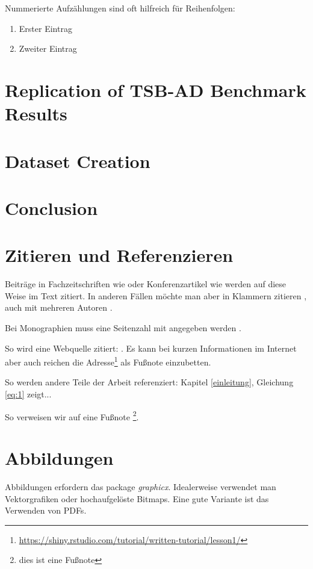 \documentclass[12pt,oneside]{article}
\begin{document}
Nummerierte Aufzählungen sind oft hilfreich für Reihenfolgen:
\begin{enumerate}
    \item Erster Eintrag
    \item Zweiter Eintrag
\end{enumerate}

\section{Replication of TSB-AD Benchmark Results}

\section{Dataset Creation}

\section{Conclusion}

\section{Zitieren und Referenzieren}

Beiträge in Fachzeitschriften wie \citet{clemen1989combining} oder Konferenzartikel wie \citet{he2017mask} werden auf diese Weise im Text zitiert. In anderen Fällen möchte man aber in Klammern zitieren \citep{clemen1989combining}, auch mit mehreren Autoren \citep{clemen1989combining,baumol1958warehouse,he2017mask}.

Bei Monographien muss eine Seitenzahl mit angegeben werden \citep[S. 28]{chollet2018deep}.

So wird eine Webquelle zitiert: \citet{shiny1}. Es kann bei kurzen Informationen im Internet aber auch reichen die Adresse\footnote{\url{https://shiny.rstudio.com/tutorial/written-tutorial/lesson1/}} als Fußnote einzubetten.

So werden andere Teile der Arbeit referenziert: Kapitel \ref{einleitung}, Gleichung \ref{eq:1} zeigt...

So verweisen wir auf eine Fußnote \footnote{dies ist eine Fußnote}.

\section{Abbildungen}

Abbildungen erfordern das package \textit{graphicx}. 
Idealerweise verwendet man Vektorgrafiken oder hochaufgelöste Bitmaps. 
Eine gute Variante ist das Verwenden von PDFs.
\end{document}
